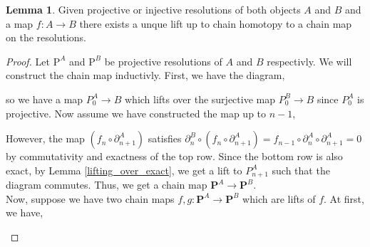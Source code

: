 \documentclass[12pt]{article}
\theoremstyle{remark}
\theoremstyle{definition}
\newtheorem{lemma}[theorem]{Lemma}
\begin{document}
\begin{lemma}
Given projective or injective resolutions of both objects $A$ and $B$ and a map $f : A \to B$ there exists a unque lift up to chain homotopy to a chain map on the resolutions. 
\end{lemma}

\begin{proof}
Let $\mathrm{P}^A$ and $\mathrm{P}^B$ be projective resolutions of $A$ and $B$ respectivly. 
We will construct the chain map inductivly. First, we have the diagram,
\begin{center}
\end{center}
so we have a map $P_0^A \to B$ which lifts over the surjective map $P_0^B \to B$ since $P_0^A$ is projective. Now assume we have constructed the map up to $n - 1$, 
\begin{center}
\end{center}
However, the map $(f_n \circ \partial^A_{n+1})$ satisfies $\partial_n^B \circ (f_n \circ \partial^A_{n+1}) = f_{n-1} \circ \partial_n^A \circ \partial_{n+1}^A = 0$ by commutativity and exactness of the top row. Since the bottom row is also exact, by Lemma \ref{lifting_over_exact}, we get a lift to $P^A_{n+1}$ such that the diagram commutes. Thus, we get a chain map $\mathbf{P}^A \to \mathbf{P}^B$. 
\bigskip\\
Now, suppose we have two chain maps $f,g : \mathbf{P}^A \to \mathbf{P}^B$ which are lifts of $f$. At first, we have,
\begin{center}
\end{center}
\end{proof}
\end{document}
